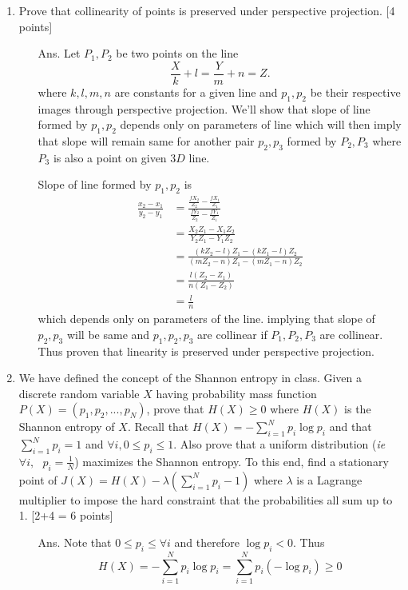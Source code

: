 \documentclass[11pt]{article}
\begin{document}
\begin{enumerate}
\item Prove that collinearity of points is preserved under perspective projection. \textsf{[4 points]} 

\begin{itemize}
\item[Ans.] Let $P_1,P_2$ be two points on the line \[
\frac{X}{k}+l = \frac{Y}{m}+n = Z.
\]
where $k,l,m,n$ are constants for a given line and $p_1,p_2$ be their respective images through perspective projection.
 We'll show that slope of line formed by $p_1,p_2$ depends only on parameters of line which will then imply that slope will remain same for another pair $p_2,p_3$ formed by $P_2,P_3$ where $P_3$ is also a point on given $3D$ line. 


Slope of line formed by $p_1,p_2$ is 
\begin{align}
\frac{x_2-x_1}{y_2-y_1} &= \frac{\frac{f X_2}{Z_2}-\frac{f X_1}{Z_1}}{\frac{f Y_2}{Z_2}-\frac{f Y_1}{Z_1}} \\ 
 &= \frac{X_2 Z_1 - X_1 Z_2}{Y_2 Z_1 - Y_1 Z_2} \\ 
 &= \frac{(kZ_2-l)Z_1 - (kZ_1-l)Z_2}{(mZ_2-n)Z_1 - (mZ_1-n)Z_2}\\
 &= \frac{l(Z_2-Z_1)}{n(Z_1-Z_2)}\\
 &= \frac{l}{n}
\end{align}
which depends only on parameters of the line. implying that slope of $p_2,p_3$ will be same and $p_1,p_2,p_3$ are collinear if $P_1,P_2,P_3$ are collinear. \newline
Thus proven that linearity is preserved under perspective projection.
\end{itemize}

\item We have defined the concept of the Shannon entropy in class. Given a discrete random variable $X$ having probability mass function $P(X) = (p_1, p_2, ..., p_N)$, prove that $H(X) \geq 0$ where $H(X)$ is the Shannon entropy of $X$. Recall that $H(X) = -\sum\limits_{i=1}^N p_i \log p_i$ and that $\sum\limits_{i=1}^N p_i = 1$ and $\forall i, 0 \leq p_i \leq 1$. Also prove that a uniform distribution (\textit{ie} $\forall i, \textrm{ } p_i = \frac{1}{N}$) maximizes the Shannon entropy. To this end, find a stationary point of $J(X) = H(X) - \lambda (\sum\limits_{i=1}^N p_i - 1)$ where $\lambda$ is a Lagrange multiplier to impose the hard constraint that the probabilities all sum up to 1.  \textsf{[2+4 = 6 points]}

\begin{itemize}
\item[Ans.] Note that $0 \leq p_i \leq  \forall i$ and therefore $\log p_i<0$. Thus  \[
H(X) = -\sum\limits_{i=1}^N p_i \log p_i
 = \sum\limits_{i=1}^N p_i (-\log p_i)
 \geq 0
\]


\end{itemize}
\end{enumerate}
\end{document}
